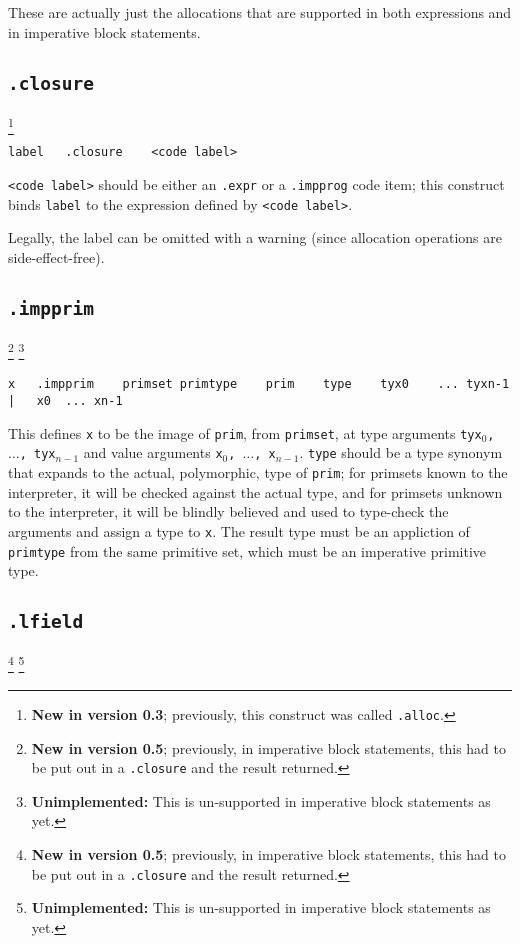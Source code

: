 \documentclass{report}
\newcommand\stringcode[1]{\texttt{#1}}
\newcommand\unimpl[1]{\footnote{\textbf{Unimplemented: }#1}}
\newcommand\new[2]{\footnote{\textbf{New in version #1}; previously, #2}}
\begin{document}
These are actually just the allocations that are supported in both expressions and in imperative block statements.

\subsection{\stringcode{.closure}}
\new{0.3}{this construct was called \stringcode{.alloc}.}

\begin{verbatim}
label	.closure	<code label>
\end{verbatim}

\stringcode{<code label>} should be either an \stringcode{.expr} or a \stringcode{.impprog} code item;
this construct binds \stringcode{label} to the expression defined by \stringcode{<code label>}.

Legally, the label can be omitted with a warning (since allocation operations are side-effect-free).

\subsection{\stringcode{.impprim}}
\new{0.5}{in imperative block statements, this had to be put out in a \stringcode{.closure} and the result returned.}
\unimpl{This is un-supported in imperative block statements as yet.}

\begin{verbatim}
x	.impprim	primset	primtype	prim	type	tyx0	...	tyxn-1	|	x0	...	xn-1
\end{verbatim}

This defines \stringcode{x} to be the image of \stringcode{prim}, from \stringcode{primset},
at type arguments \stringcode{tyx$_0$, $\ldots$, tyx$_{n-1}$}
and value arguments \stringcode{x$_0$, $\ldots$, x$_{n-1}$}.
\stringcode{type} should be a type synonym that expands to the actual, polymorphic, type of \stringcode{prim};
for primsets known to the interpreter, it will be checked against the actual type,
and for primsets unknown to the interpreter,
it will be blindly believed and used to type-check the arguments and assign a type to \stringcode{x}.
The result type must be an appliction of \stringcode{primtype} from the same primitive set,
which must be an imperative primitive type.

\subsection{\stringcode{.lfield}}
\new{0.5}{in imperative block statements, this had to be put out in a \stringcode{.closure} and the result returned.}
\unimpl{This is un-supported in imperative block statements as yet.}
\end{document}

